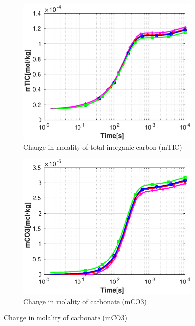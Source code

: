 \begin{figure}[!h]
\begin{subfigure}{.5\linewidth}
    \end{subfigure}%
    \hfill
    \begin{subfigure}{.5\linewidth}
            \centering
        \includegraphics[width=\textwidth]{PICTURES/without_pH_mTIC.eps}
        \caption{Change in molality of total inorganic carbon (mTIC)}
        \label{fig:withoutpHmTIC}
    \end{subfigure}%
    \hfill
    \begin{subfigure}{.5\linewidth}
            \centering
        \includegraphics[width=\textwidth]{PICTURES/without_pH_mCO3.eps}
        \caption{Change in molality of carbonate (mCO3)}

\end{subfigure}
\end{figure}
